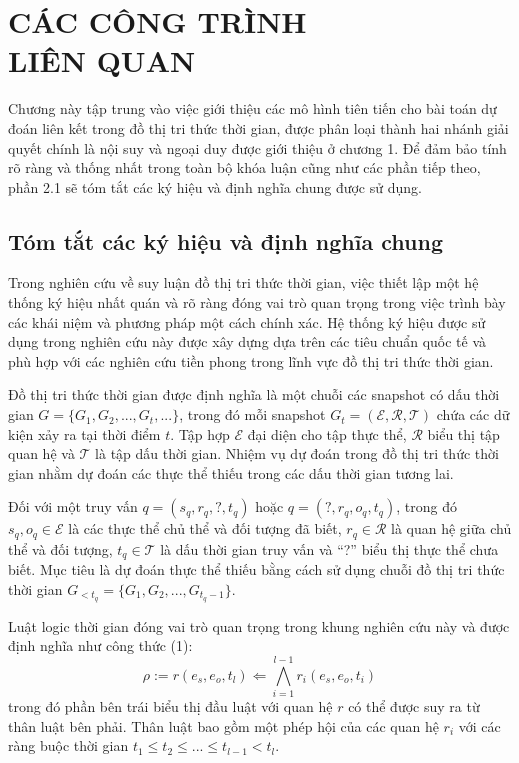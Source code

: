 \chapter{CÁC CÔNG TRÌNH \\ LIÊN QUAN}
\label{Chapter2}

Chương này tập trung vào việc giới thiệu các mô hình tiên tiến cho bài toán dự đoán liên kết trong đồ thị tri thức thời gian, được phân loại thành hai nhánh giải quyết chính là nội suy và ngoại duy được giới thiệu ở chương 1. Để đảm bảo tính rõ ràng và thống nhất trong toàn bộ khóa luận cũng như các phần tiếp theo, phần 2.1 sẽ tóm tắt các ký hiệu và định nghĩa chung được sử dụng.


\section{Tóm tắt các ký hiệu và định nghĩa chung}

Trong nghiên cứu về suy luận đồ thị tri thức thời gian, việc thiết lập một hệ thống ký hiệu nhất quán và rõ ràng đóng vai trò quan trọng trong việc trình bày các khái niệm và phương pháp một cách chính xác. Hệ thống ký hiệu được sử dụng trong nghiên cứu này được xây dựng dựa trên các tiêu chuẩn quốc tế và phù hợp với các nghiên cứu tiền phong trong lĩnh vực đồ thị tri thức thời gian.

Đồ thị tri thức thời gian được định nghĩa là một chuỗi các snapshot có dấu thời gian \( G = \{G_1, G_2, ..., G_t, ...\} \), trong đó mỗi snapshot \( G_t = (\mathcal{E}, \mathcal{R}, \mathcal{T}) \) chứa các dữ kiện xảy ra tại thời điểm \( t \). Tập hợp \( \mathcal{E} \) đại diện cho tập thực thể, \( \mathcal{R} \) biểu thị tập quan hệ và \( \mathcal{T} \) là tập dấu thời gian. Nhiệm vụ dự đoán trong đồ thị tri thức thời gian nhằm dự đoán các thực thể thiếu trong các dấu thời gian tương lai.

Đối với một truy vấn \( q = (s_q, r_q, ?, t_q) \) hoặc \( q = (?, r_q, o_q, t_q) \), trong đó \( s_q, o_q \in \mathcal{E} \) là các thực thể chủ thể và đối tượng đã biết, \( r_q \in \mathcal{R} \) là quan hệ giữa chủ thể và đối tượng, \( t_q \in \mathcal{T} \) là dấu thời gian truy vấn và ``?'' biểu thị thực thể chưa biết. Mục tiêu là dự đoán thực thể thiếu bằng cách sử dụng chuỗi đồ thị tri thức thời gian \( G_{<t_q} = \{G_1, G_2, ..., G_{t_q-1}\} \).

Luật logic thời gian \cite{ref_article23} đóng vai trò quan trọng trong khung nghiên cứu này và được định nghĩa như công thức (1): 
\[
\rho := r(e_s, e_o, t_l) \Leftarrow \bigwedge_{i=1}^{l-1} r_i(e_s, e_o, t_i)
\]
trong đó phần bên trái biểu thị đầu luật với quan hệ \( r \) có thể được suy ra từ thân luật bên phải. Thân luật bao gồm một phép hội của các quan hệ \( r_i \) với các ràng buộc thời gian \( t_1 \leq t_2 \leq ... \leq t_{l-1} < t_l \).

